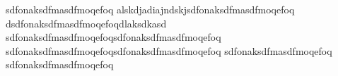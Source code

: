 sdfonaksdfmasdfmoqefoq
alskdjadiajndskjsdfonaksdfmasdfmoqefoq
dsdfonaksdfmasdfmoqefoqdlaksdkasd
sdfonaksdfmasdfmoqefoqsdfonaksdfmasdfmoqefoq
sdfonaksdfmasdfmoqefoqsdfonaksdfmasdfmoqefoq
sdfonaksdfmasdfmoqefoq
sdfonaksdfmasdfmoqefoq